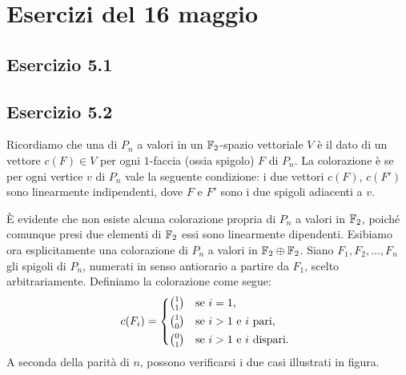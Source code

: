 \section*{Esercizi del 16 maggio}
\subsection*{Esercizio 5.1}

\subsection*{Esercizio 5.2}
Ricordiamo che una  di $P_n$ a valori in un $\mathbb{F}_2$-spazio vettoriale $V$ è il dato di un vettore $c(F)\in V$ per ogni $1$-faccia (ossia spigolo) $F$ di $P_n$. La colorazione è  se per ogni vertice $v$ di $P_n$  vale la seguente condizione: i due vettori $c(F)$, $c(F')$ sono linearmente indipendenti, dove $F$ e $F'$ sono i due spigoli adiacenti a $v$.

È evidente che non esiste alcuna colorazione propria di $P_n$ a valori in $\mathbb{F}_2$, poiché comunque presi due elementi di $\mathbb{F}_2$ essi sono linearmente dipendenti. Esibiamo ora esplicitamente una colorazione di $P_n$ a valori in $\mathbb{F}_2\oplus\mathbb{F}_2$. Siano $F_1,F_2,\ldots,F_n$ gli spigoli di $P_n$, numerati in senso antiorario a partire da $F_1$, scelto arbitrariamente. Definiamo la colorazione come segue:
\[
c(F_i)=\begin{cases*}
1\choose1&se $i=1$,\\
1\choose0&se $i>1$ e $i$ pari,\\
0\choose1&se $i>1$ e $i$ dispari.
\end{cases*}
\]
A seconda della parità di $n$, possono verificarsi i due casi illustrati in figura.

